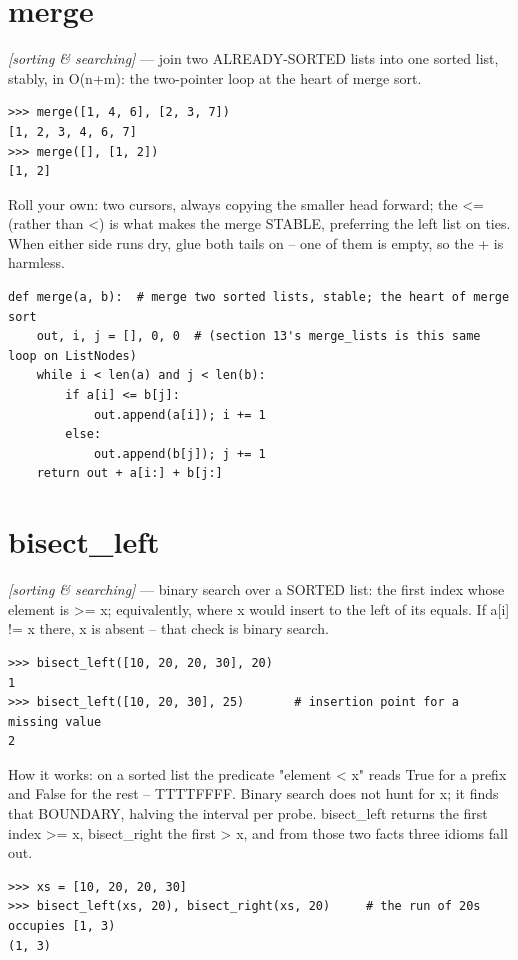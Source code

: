 \documentclass[11pt,letterpaper]{book}
\begin{document}
\section{merge}
\noindent\textit{[sorting \& searching]} --- join two ALREADY-SORTED lists into one sorted list, stably, in O(n+m): the two-pointer loop at the heart of merge sort.
\begin{lstlisting}[style=spec]
>>> merge([1, 4, 6], [2, 3, 7])
[1, 2, 3, 4, 6, 7]
>>> merge([], [1, 2])
[1, 2]
\end{lstlisting}

Roll your own: two cursors, always copying the smaller head forward; the <= (rather than <) is what makes the merge STABLE, preferring the left list on ties. When either side runs dry, glue both tails on -- one of them is empty, so the + is harmless.

\begin{lstlisting}[style=code]
def merge(a, b):  # merge two sorted lists, stable; the heart of merge sort
    out, i, j = [], 0, 0  # (section 13's merge_lists is this same loop on ListNodes)
    while i < len(a) and j < len(b):
        if a[i] <= b[j]:
            out.append(a[i]); i += 1
        else:
            out.append(b[j]); j += 1
    return out + a[i:] + b[j:]
\end{lstlisting}

\section{bisect\_left}
\noindent\textit{[sorting \& searching]} --- binary search over a SORTED list: the first index whose element is >= x; equivalently, where x would insert to the left of its equals. If a[i] != x there, x is absent -- that check is binary search.
\begin{lstlisting}[style=spec]
>>> bisect_left([10, 20, 20, 30], 20)
1
>>> bisect_left([10, 20, 30], 25)       # insertion point for a missing value
2
\end{lstlisting}

How it works: on a sorted list the predicate "element < x" reads True for a prefix and False for the rest -- TTTTFFFF. Binary search does not hunt for x; it finds that BOUNDARY, halving the interval per probe. bisect\_left returns the first index >= x, bisect\_right the first > x, and from those two facts three idioms fall out.

\begin{lstlisting}[style=spec]
>>> xs = [10, 20, 20, 30]
>>> bisect_left(xs, 20), bisect_right(xs, 20)     # the run of 20s occupies [1, 3)
(1, 3)
\end{lstlisting}
\end{document}

